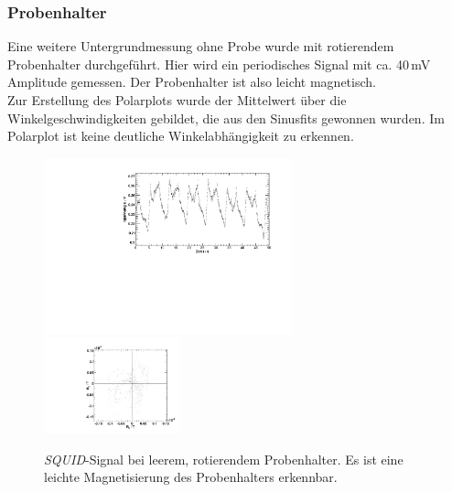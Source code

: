 \subsubsection{Probenhalter}
Eine weitere Untergrundmessung ohne Probe wurde mit rotierendem Probenhalter durchgeführt.
Hier wird ein periodisches Signal mit ca. 40\,mV Amplitude gemessen.
Der Probenhalter ist also leicht magnetisch.\\
Zur Erstellung des Polarplots wurde der Mittelwert über die Winkelgeschwindigkeiten gebildet,
die aus den Sinusfits gewonnen wurden.
Im Polarplot ist keine deutliche Winkelabhängigkeit zu erkennen.



\begin{figure}[H]
\begin{center}
  \includegraphics[width=0.64\textwidth]{../img/emptyHolder.pdf}
  \includegraphics[width=0.35\textwidth]{../img/polar_emptyHolder.pdf}
  \caption{\emph{SQUID}-Signal bei leerem, rotierendem Probenhalter. Es ist eine leichte Magnetisierung des
  Probenhalters erkennbar.}
  \label{img:holder}
\end{center}
\end{figure}





